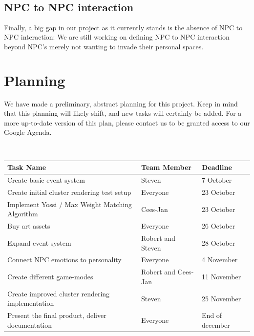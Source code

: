 \documentclass[11pt]{article} %
\begin{document}
~\\
\subsection{NPC to NPC interaction}
Finally, a big gap in our project as it currently stands is the absence of NPC to NPC interaction: We are still working on defining NPC to NPC interaction beyond NPC's merely not wanting to invade their personal spaces.

\newpage
\section{Planning}
We have made a preliminary, abstract planning for this project. Keep in mind that this planning will likely shift, and new tasks will certainly be added. For a more up-to-date version of this plan, please contact us to be granted access to our Google Agenda.

~\\
\begin{tabular}{|  l | l | l | }
  \hline			
  Task Name & Team Member & Deadline  \\ \hline
  Create basic event system & Steven & 7 October \\ \hline 
  Create initial cluster rendering test setup & Everyone & 23 October \\ \hline 
  Implement Yossi / Max Weight Matching Algorithm & Cees-Jan & 23 October \\ \hline
  Buy  art assets & Everyone & 26 October \\ \hline 
  Expand event system & Robert and Steven & 28 October \\ \hline  
  Connect NPC emotions to personality & Everyone & 4 November \\ \hline
  Create different game-modes & Robert and Cees-Jan & 11 November \\ \hline
  Create improved cluster rendering implementation & Steven & 25 November \\ \hline  
  Present the final product, deliver documentation & Everyone & End of december \\ \hline
\end{tabular}
\end{document}
